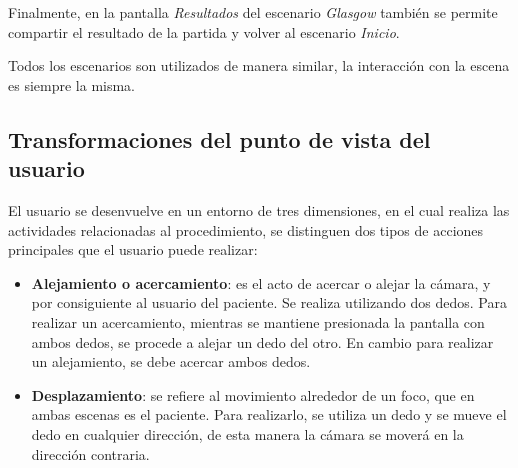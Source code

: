Finalmente, en la pantalla \emph{Resultados} del escenario \emph{Glasgow} también se permite 
compartir el resultado de la partida y volver al escenario \emph{Inicio}.

Todos los escenarios son utilizados de manera similar, la interacción con la
escena es siempre la misma.

\subsection{Transformaciones del punto de vista del usuario}

El usuario se desenvuelve en un entorno de tres dimensiones, en el cual realiza
las actividades relacionadas al procedimiento, se distinguen dos tipos de acciones
principales que el usuario puede realizar:

\begin{itemize}
    \item \textbf{Alejamiento o acercamiento}: es el acto de acercar o alejar la
        cámara, y por consiguiente al usuario del paciente. Se realiza
        utilizando dos dedos. Para realizar un acercamiento, mientras se
        mantiene presionada la pantalla con ambos dedos, se procede a alejar un
        dedo del otro. En cambio para realizar un alejamiento, se debe acercar ambos
        dedos.
    \item \textbf{Desplazamiento}: se refiere al movimiento alrededor de
        un foco, que en ambas escenas es el paciente. Para realizarlo, se utiliza
        un dedo y se mueve el dedo en cualquier dirección, de esta manera la cámara se moverá
        en la dirección contraria.
\end{itemize}


